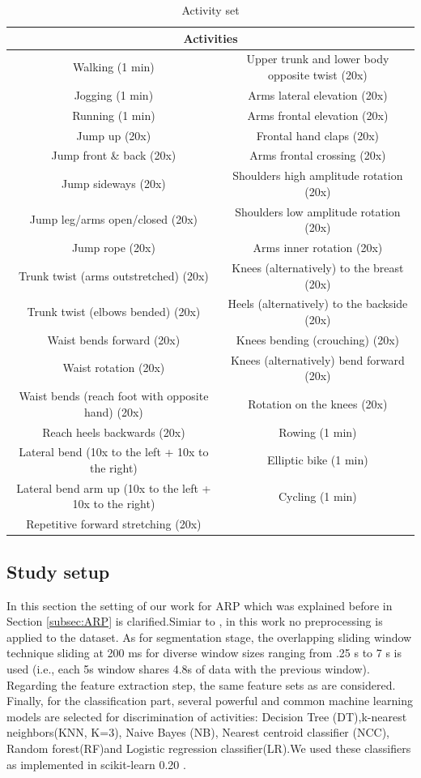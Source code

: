 \begin{table}[h!]
\tiny  
  \centering
\begin{tabular}{|c|c|}
\hline 
\multicolumn{2}{|c|}{Activities}\tabularnewline
\hline 
\hline 
Walking (1 min) & Upper trunk and lower body opposite twist (20x)\tabularnewline
\hline 
Jogging (1 min) & Arms lateral elevation (20x)\tabularnewline
\hline 
Running (1 min) & Arms frontal elevation (20x)\tabularnewline
\hline 
Jump up (20x) & Frontal hand claps (20x)\tabularnewline
\hline 
Jump front \& back (20x) & Arms frontal crossing (20x)\tabularnewline
\hline 
Jump sideways (20x) & Shoulders high amplitude rotation (20x)\tabularnewline
\hline 
Jump leg/arms open/closed (20x) & Shoulders low amplitude rotation (20x)\tabularnewline
\hline 
Jump rope (20x) & Arms inner rotation (20x)\tabularnewline
\hline 
Trunk twist (arms outstretched) (20x) & Knees (alternatively) to the breast (20x)\tabularnewline
\hline 
Trunk twist (elbows bended) (20x) & Heels (alternatively) to the backside (20x)\tabularnewline
\hline 
Waist bends forward (20x) & Knees bending (crouching) (20x)\tabularnewline
\hline 
Waist rotation (20x) & Knees (alternatively) bend forward (20x)\tabularnewline
\hline 
Waist bends (reach foot with opposite hand) (20x) & Rotation on the knees (20x)\tabularnewline
\hline 
Reach heels backwards (20x) & Rowing (1 min)\tabularnewline
\hline 
Lateral bend (10x to the left + 10x to the right) & Elliptic bike (1 min)\tabularnewline
\hline 
Lateral bend arm up (10x to the left + 10x to the right) & Cycling (1 min)\tabularnewline
\hline 
Repetitive forward stretching (20x) & \tabularnewline
\hline 
\end{tabular}

        \caption{Activity set }
        \label{tab:Activites}

\end{table} 


\subsection{Study setup}
In this section the setting of our work for ARP which was explained before in Section \ref{subsec:ARP} is clarified.Simiar to \cite{banos2014window}, in this work no preprocessing is applied to the dataset. As for segmentation stage, the overlapping sliding window technique sliding at 200 ms for diverse window sizes ranging from .25 s to 7 s is used (i.e., each 5s window shares 4.8s of data with the previous window). Regarding the feature extraction step, the same feature sets as \cite{banos2014window} are considered. Finally, for the classification part, several powerful and common machine learning models are selected for discrimination of activities: Decision Tree (DT),k-nearest neighbors(KNN, K=3), Naive Bayes (NB), Nearest centroid classifier (NCC), Random forest(RF)and Logistic regression classifier(LR).We used these classifiers as implemented in scikit-learn 0.20 \cite{pedregosa2011scikit}.\newline

